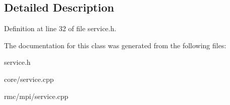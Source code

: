 \subsection{Detailed Description}




Definition at line 32 of file service.h.

The documentation for this class was generated from the following files:\begin{CompactItemize}
\item 
service.h\item 
core/service.cpp\item 
rmc/mpi/service.cpp\end{CompactItemize}

